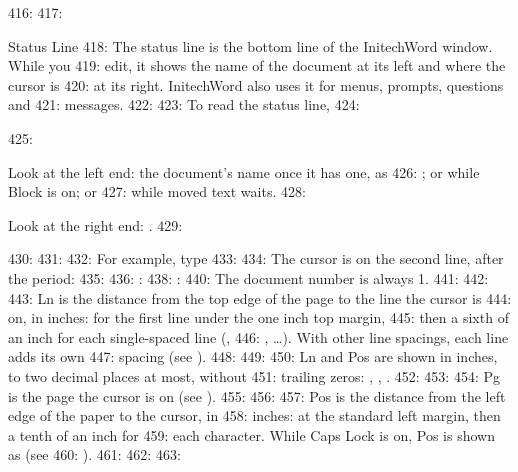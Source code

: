 416: 
417: \begin{Feature}{Status Line}
418: The status line is the bottom line of the InitechWord window.  While you
419: edit, it shows the name of the document at its left and where the cursor is
420: at its right.  InitechWord also uses it for menus, prompts, questions and
421: messages.
422: 
423: To read the status line,
424: \begin{WPSteps}
425: \item Look at the left end: the document's name once it has one, as
426: ; or  while Block is on; or
427:  while moved text waits.
428: \item Look at the right end: .
429: \end{WPSteps}
430: 
431: 
432: For example, type
433: 
434: The cursor is on the second line, after the period:
435: 
436: : 
438: : 
440: The document number is always 1.
441: 
442: 
443: Ln is the distance from the top edge of the page to the line the cursor is
444: on, in inches:  for the first line under the one inch top margin,
445: then a sixth of an inch for each single-spaced line (,
446: , \ldots).  With other line spacings, each line adds its own
447: spacing (see ).
448: 
449: 
450: Ln and Pos are shown in inches, to two decimal places at most, without
451: trailing zeros: , , .
452: 
453: 
454: Pg is the page the cursor is on (see ).
455: 
456: 
457: Pos is the distance from the left edge of the paper to the cursor, in
458: inches:  at the standard left margin, then a tenth of an inch for
459: each character.  While Caps Lock is on, Pos is shown as  (see
460: ).
461: 
462: 
463: \end{Feature}
